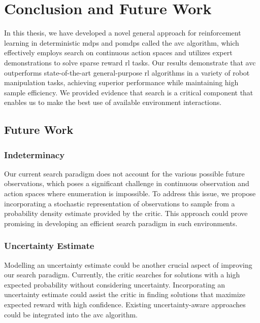 
\chapter{Conclusion and Future Work}
\label{chapter:Conc_Fut}
In this thesis, we have developed a novel general approach for reinforcement learning in deterministic \ac{mdp}s and \ac{pomdp}s called the \ac{avc} algorithm, 
which effectively employs search on continuous action spaces and utilizes 
expert demonstrations to solve sparse reward \ac{rl} tasks. Our results demonstrate that \ac{avc} 
outperforms state-of-the-art general-purpose \ac{rl} algorithms in a variety of robot manipulation tasks, achieving superior performance 
while maintaining high sample efficiency. We provided evidence that search is a critical component that enables us to make the best use of available 
environment interactions.

\section{Future Work}
\subsection{Indeterminacy}
Our current search paradigm does not account for the various possible future observations, which poses a significant challenge in 
continuous observation and action spaces where enumeration is impossible. To address this issue, we propose incorporating a stochastic 
representation of observations to sample from a probability density estimate provided by the critic. 
This approach could prove promising in developing an efficient search paradigm in such environments.

\subsection{Uncertainty Estimate}
Modelling an uncertainty estimate could be another crucial aspect of improving our search paradigm. 
Currently, the critic searches for solutions with a high expected probability without considering uncertainty. 
Incorporating an uncertainty estimate could assist the critic in finding solutions that maximize expected reward with high confidence. 
Existing uncertainty-aware approaches \cite{gawlikowski2022survey,liu2022simple} 
could be integrated into the \ac{avc} algorithm.


